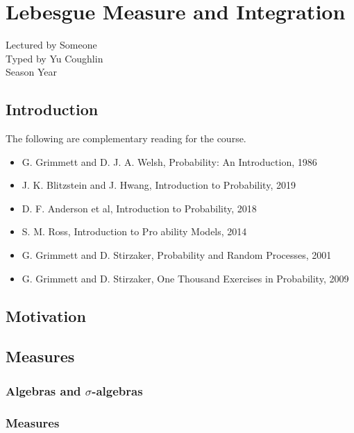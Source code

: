 \documentclass[../Year2.tex]{subfiles}
\begin{document}
\chapter{Lebesgue Measure and Integration}
\renewcommand*\thesection{\arabic{section}}
Lectured by Someone \\ Typed by Yu Coughlin \\
Season Year

\section*{Introduction}

The following are complementary reading for the course.
\begin{itemize}
    \item G. Grimmett and D. J. A. Welsh, Probability: An Introduction, 1986
    \item J. K. Blitzstein and J. Hwang, Introduction to Probability, 2019
    \item D. F. Anderson et al, Introduction to Probability, 2018
    \item S. M. Ross, Introduction to Pro ability Models, 2014
    \item G. Grimmett and D. Stirzaker, Probability and Random Processes, 2001
    \item G. Grimmett and D. Stirzaker, One Thousand Exercises in Probability, 2009
\end{itemize}

\tableofcontents\pagebreak


\section{Motivation}

\section{Measures}

\subsection{Algebras and \texorpdfstring{$\sigma$}{o}-algebras}

\subsection{Measures}
\end{document}
